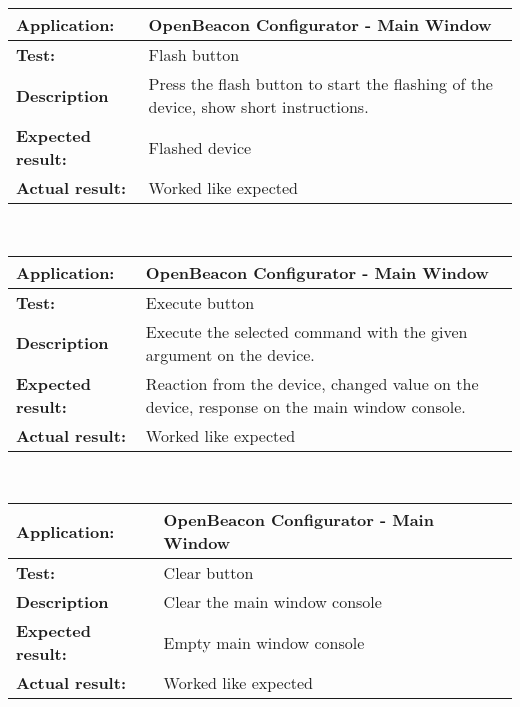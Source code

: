    \begin{tabular}{|p{3.5cm}|p{10.5cm}|}
    \hline
     \textbf{Application:}	& OpenBeacon Configurator - Main Window\\
    \hline
     \textbf{Test:}		& Flash button\\
    \hline
     \textbf{Description}	& Press the flash button to start the flashing of the device, show short instructions.\\
    \hline
     \textbf{Expected result:}	& Flashed device\\
    \hline
     \textbf{Actual result:}	& Worked like expected\\
    \hline
   \end{tabular}\\
   \begin{tabular}{|p{3.5cm}|p{10.5cm}|}
    \hline
     \textbf{Application:}	& OpenBeacon Configurator - Main Window\\
    \hline
     \textbf{Test:}		& Execute button\\
    \hline
     \textbf{Description}	& Execute the selected command with the given argument on the device.\\
    \hline
     \textbf{Expected result:}	& Reaction from the device, changed value on the device, response on the main window console.\\
    \hline
     \textbf{Actual result:}	& Worked like expected\\
    \hline
   \end{tabular}\\
   \begin{tabular}{|p{3.5cm}|p{10.5cm}|}
    \hline
     \textbf{Application:}	& OpenBeacon Configurator - Main Window\\
    \hline
     \textbf{Test:}		& Clear button\\
    \hline
     \textbf{Description}	& Clear the main window console\\
    \hline
     \textbf{Expected result:}	& Empty main window console\\
    \hline
     \textbf{Actual result:}	& Worked like expected\\
    \hline
   \end{tabular}

